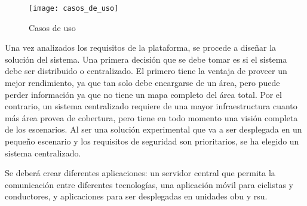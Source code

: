 \begin{figure}[H]
	\begin{center}
		\texttt{[image: casos\_de\_uso]}
		\caption{Casos de uso}
		\label{fig:casos_de_uso}
	\end{center}
\end{figure}

Una vez analizados los requisitos de la plataforma, se procede a diseñar la
solución del sistema. Una primera decisión que se debe tomar es si el sistema
debe ser distribuido o centralizado. El primero tiene la ventaja de proveer un
mejor rendimiento, ya que tan solo debe encargarse de un área, pero puede perder
información ya que no tiene un mapa completo del área total. Por el contrario,
un sistema centralizado requiere de una mayor infraestructura cuanto más área
provea de cobertura, pero tiene en todo momento una visión completa de los
escenarios. Al ser una solución experimental que va a ser desplegada en un
pequeño escenario y los requisitos de seguridad son prioritarios, se ha elegido
un sistema centralizado.

Se deberá crear diferentes aplicaciones: un servidor central que permita la
comunicación entre diferentes tecnologías, una aplicación móvil para ciclistas y
conductores, y aplicaciones para ser desplegadas en unidades \gls{obu} y
\gls{rsu}.

